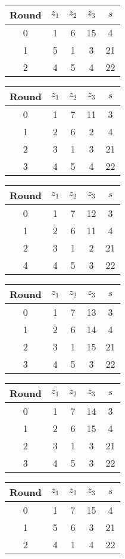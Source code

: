\begin{multicols}{2}
\begin{tabular}{c | c | c | c | c }
Round & $z_1$ & $z_2$ & $z_3$ & $s$ \\
\hline
0 & 1 & 6 & 15 & 4 \\
1 & 5 & 1 & 3 & 21 \\
2 & 4 & 5 & 4 & 22 \\
\end{tabular}


\begin{tabular}{c | c | c | c | c }
Round & $z_1$ & $z_2$ & $z_3$ & $s$ \\
\hline
0 & 1 & 7 & 11 & 3 \\
1 & 2 & 6 & 2 & 4 \\
2 & 3 & 1 & 3 & 21 \\
3 & 4 & 5 & 4 & 22
\end{tabular}


\begin{tabular}{c | c | c | c | c }
Round & $z_1$ & $z_2$ & $z_3$ & $s$ \\
\hline
0 & 1 & 7 & 12 & 3 \\
1 & 2 & 6 & 11 & 4 \\
2 & 3 & 1 & 2 & 21 \\
4 & 4 & 5 & 3 & 22
\end{tabular}


\begin{tabular}{c | c | c | c | c }
Round & $z_1$ & $z_2$ & $z_3$ & $s$ \\
\hline
0 & 1 & 7 & 13 & 3 \\
1 & 2 & 6 & 14 & 4 \\
2 & 3 & 1 & 15 & 21 \\
3 & 4 & 5 & 3 & 22
\end{tabular}


\begin{tabular}{c | c | c | c | c }
Round & $z_1$ & $z_2$ & $z_3$ & $s$ \\
\hline
0 & 1 & 7 & 14 & 3 \\
1 & 2 & 6 & 15 & 4 \\
2 & 3 & 1 & 3 & 21 \\
3 & 4 & 5 & 3 & 22
\end{tabular}


\begin{tabular}{c | c | c | c | c }
Round & $z_1$ & $z_2$ & $z_3$ & $s$ \\
\hline
0 & 1 & 7 & 15 & 4 \\
1 & 5 & 6 & 3 & 21 \\
2 & 4 & 1 & 4 & 22 \\
\end{tabular}



\end{multicols}
